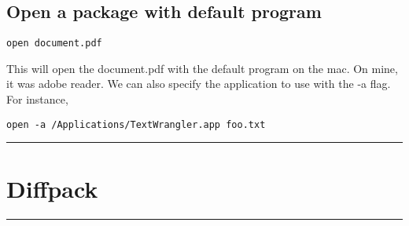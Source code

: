 \documentclass[a4paper, 10pt]{article}
\newcommand{\mytoprule}{\hrule\vspace{4mm}}
\newcommand{\mybotrule}{\vspace{4mm}\hrule}
\begin{document}
\subsection*{Open a package with default program}
\begin{Verbatim}[commandchars=\\\{\}]
open document.pdf
\end{Verbatim}

This will open the document.pdf with the default program on the mac. On mine, it was adobe reader. We can also specify the application to use with the -a flag. For instance,
\begin{Verbatim}[commandchars=\\\{\}]
open -a /Applications/TextWrangler.app foo.txt
\end{Verbatim}

\mybotrule

\vspace{10mm}
\section*{Diffpack}

\mytoprule
\end{document}
